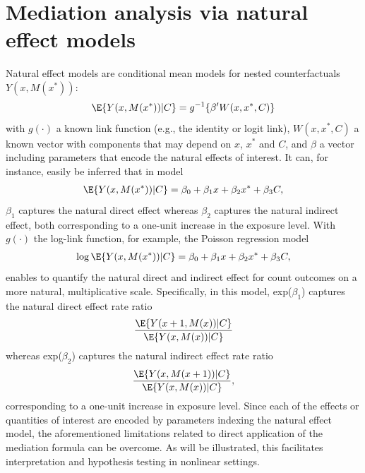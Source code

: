 \documentclass[nojss]{jss}
\begin{document}
\section{Mediation analysis via natural effect models}\label{nateff}
Natural effect models are conditional mean models for nested counterfactuals $Y(x,M(x^*))$:
\begin{align*}
\E \{ Y(x,M(x^*)) \vert C \} = g^{-1} \{ \beta' W(x,x^*,C) \}
\end{align*}
with $g(\cdot)$ a known link function (e.g., the identity or logit link), $W(x,x^*,C)$ a known vector with components that may depend on $x$, $x^*$ and $C$, and $\beta$ a vector including parameters that encode the natural effects of interest. It can, for instance, easily be inferred that in model
\begin{align*}
\E \{ Y(x,M(x^*)) \vert C \} = \beta_0 + \beta_1 x + \beta_2 x^* + \beta_3 C,
\end{align*}
$\beta_1$ captures the natural direct effect whereas $\beta_2$ captures the natural indirect effect, both corresponding to a one-unit increase in the exposure level. With $g(\cdot)$ the log-link function, for example, the Poisson regression model
\begin{align*}
\log \E \{ Y(x,M(x^*)) \vert C \} = \beta_0 + \beta_1 x + \beta_2 x^* + \beta_3 C,
\end{align*}
enables to quantify the natural direct and indirect effect for count outcomes on a more natural, multiplicative scale. Specifically, in this model, exp($\beta_1$) captures the natural direct effect rate ratio $$\dfrac{\E\{ Y(x+1,M(x)) \vert C \}}{\E\{ Y(x,M(x)) \vert C \}}$$ whereas exp($\beta_2$) captures the natural indirect effect rate ratio $$\dfrac{\E\{ Y(x,M(x+1)) \vert C \}}{\E\{ Y(x,M(x)) \vert C \}},$$ corresponding to a one-unit increase in exposure level. Since each of the effects or quantities of interest are encoded by parameters indexing the natural effect model, the aforementioned limitations related to direct application of the mediation formula can be overcome. As will be illustrated, this facilitates interpretation and hypothesis testing in nonlinear settings.

\newpage
\end{document}
